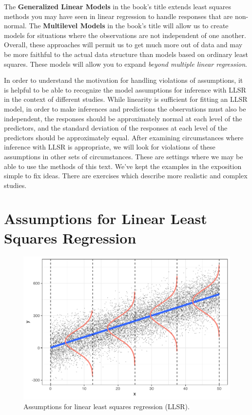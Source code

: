\documentclass[
]{krantz}
\begin{document}
The \textbf{Generalized Linear Models}  in the book's title extends least squares methods you may have seen in linear regression to handle responses that are non-normal. The \textbf{Multilevel Models}  in the book's title will allow us to create models for situations where the observations are not independent of one another. Overall, these approaches will permit us to get much more out of data and may be more faithful to the actual data structure than models based on ordinary least squares. These models will allow you to expand \emph{beyond multiple linear regression}.

In order to understand the motivation for handling violations of assumptions, it is helpful to be able to recognize the model assumptions for inference with LLSR in the context of different studies. While linearity is sufficient for fitting an LLSR model, in order to make inferences and predictions the observations must also be independent, the responses should be approximately normal at each level of the predictors, and the standard deviation of the responses at each level of the predictors should be approximately equal. After examining circumstances where inference with LLSR is appropriate, we will look for violations of these assumptions in other sets of circumstances. These are settings where we may be able to use the methods of this text. We've kept the examples in the exposition simple to fix ideas. There are exercises which describe more realistic and complex studies.

\hypertarget{assumptions-for-linear-least-squares-regression}{%
\section{Assumptions for Linear Least Squares Regression}\label{assumptions-for-linear-least-squares-regression}}

\begin{figure}

{\centering \includegraphics[width=0.9\linewidth]{bookdown-BeyondMLR_files/figure-latex/OLSassumptions-1} 

}

\caption{Assumptions for linear least squares regression (LLSR).}\label{fig:OLSassumptions}
\end{figure}
\end{document}
